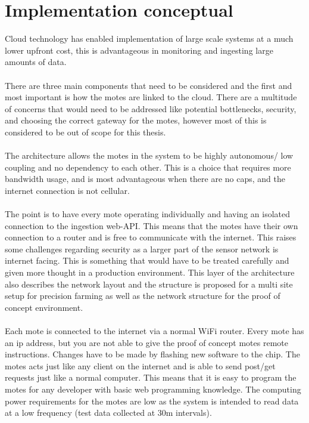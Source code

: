 \documentclass[]{uiophd}
\begin{document}
\section{Implementation conceptual}
Cloud technology has enabled implementation of large scale systems at a much lower upfront cost, this is advantageous in monitoring and ingesting large amounts of data.
\\\\
There are three main components that need to be considered and the first and most important is how the motes are linked to the cloud. There are a multitude of concerns that would need to be addressed like potential bottlenecks, security, and choosing the correct gateway for the motes, however most of this is considered to be out of scope for this thesis.
\\\\
The architecture allows the motes in the system to be highly autonomous/ low coupling and no dependency to each other. This is a choice that requires more bandwidth usage, and is most advantageous when there are no caps, and the internet connection is not cellular.
\\\\
The point is to have every mote operating individually and having an isolated connection to the ingestion web-API. This means that the motes have their own connection to a router and is free to communicate with the internet. This raises some challenges regarding security as a larger part of the sensor network is internet facing. This is something that would have to be treated carefully and given more thought in a production environment. This layer of the architecture also describes the network layout and the structure is proposed for a multi site setup for precision farming as well as the network structure for the proof of concept environment.
\\\\
Each mote is connected to the internet via a normal WiFi router. Every mote has an ip address, but you are not able to give the proof of concept motes remote instructions. Changes have to be made by flashing new software to the chip. The motes acts just like any client on the internet and is able to send post/get requests just like a normal computer. This means that it is easy to program the motes for any developer with basic web programming knowledge. The computing power requirements for the motes are low as the system is intended to read data at a low frequency (test data collected at 30m intervals).
\\\\
\end{document}
